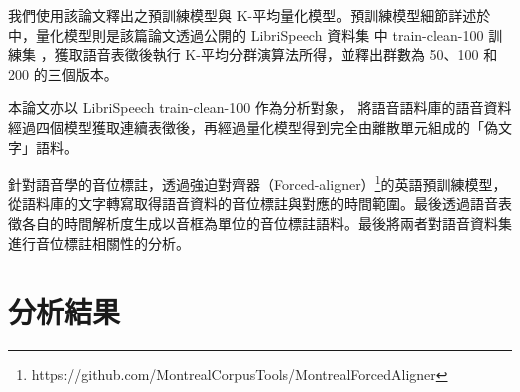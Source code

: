 我們使用該論文釋出之預訓練模型與 K-平均量化模型。預訓練模型細節詳述於 \cite{lakhotia_generative_2021-1} 中，量化模型則是該篇論文透過公開的 LibriSpeech 資料集 \cite{panayotov_librispeech_2015} 中 train-clean-100 訓練集
，獲取語音表徵後執行 K-平均分群演算法所得，並釋出群數為 50、100 和 200 的三個版本。


        本論文亦以 LibriSpeech train-clean-100 作為分析對象，
將語音語料庫的語音資料經過四個模型獲取連續表徵後，再經過量化模型得到完全由離散單元組成的「偽文字」語料。

        針對語音學的音位標註，透過強迫對齊器（Forced-aligner）\footnote{https://github.com/MontrealCorpusTools/Montreal­Forced­Aligner}的英語預訓練模型，從語料庫的文字轉寫取得語音資料的音位標註與對應的時間範圍。最後透過語音表徵各自的時間解析度生成以音框為單位的音位標註語料。最後將兩者對語音資料集進行音位標註相關性的分析。

\section{分析結果}


